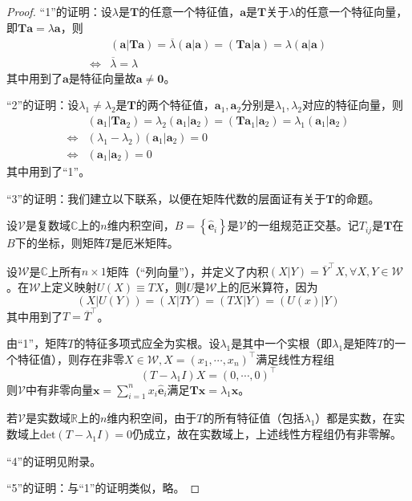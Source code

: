 \documentclass[main.tex]{subfiles}
\begin{document}
\begin{proof}
    “1”的证明：设$\lambda$是$\mathbf{T}$的任意一个特征值，$\mathbf{a}$是$\mathbf{T}$关于$\lambda$的任意一个特征向量，即$\mathbf{Ta}=\lambda\mathbf{a}$，则
    \begin{align*}
                        & \left(\mathbf{a}|\mathbf{Ta}\right)=\overline{\lambda}\left(\mathbf{a}|\mathbf{a}\right)=\left(\mathbf{Ta}|\mathbf{a}\right)=\lambda\left(\mathbf{a}|\mathbf{a}\right) \\
        \Leftrightarrow & \overline{\lambda}=\lambda
    \end{align*}
    其中用到了$\mathbf{a}$是特征向量故$\mathbf{a}\neq\mathbf{0}$。

    “2”的证明：设$\lambda_1\neq\lambda_2$是$\mathbf{T}$的两个特征值，$\mathbf{a}_1,\mathbf{a}_2$分别是$\lambda_1,\lambda_2$对应的特征向量，则
    \begin{align*}
                        & \left(\mathbf{a}_1|\mathbf{Ta}_2\right)=\lambda_2\left(\mathbf{a}_1|\mathbf{a}_2\right)=\left(\mathbf{Ta}_1|\mathbf{a}_2\right)=\lambda_1\left(\mathbf{a}_1|\mathbf{a}_2\right) \\
        \Leftrightarrow & \left(\lambda_1-\lambda_2\right)\left(\mathbf{a}_1|\mathbf{a}_2\right)=0                                                                                                        \\
        \Leftrightarrow & \left(\mathbf{a}_1|\mathbf{a}_2\right)=0
    \end{align*}
    其中用到了“1”。

    “3”的证明：我们建立以下联系，以便在矩阵代数的层面证有关于$\mathbf{T}$的命题。

    设$\mathcal{V}$是复数域$\mathbb{C}$上的$n$维内积空间，$B=\left\{\mathbf{\hat{e}}_i\right\}$是$\mathcal{V}$的一组规范正交基。记$T_{ij}$是$\mathbf{T}$在$B$下的坐标，则矩阵$T$是厄米矩阵。

    设$\mathcal{W}$是$\mathbb{C}$上所有$n\times 1$矩阵（“列向量”），并定义了内积$\left(X|Y\right)=\overline{Y}^\intercal X,\forall X,Y\in\mathcal{W}$。在$\mathcal{W}$上定义映射$U\left(X\right)\equiv TX$，则$U$是$\mathcal{W}$上的厄米算符，因为
    \[\left(X|U\left(Y\right)\right)=\left(X|TY\right)=\left(TX|Y\right)=\left(U\left(x\right)|Y\right)\]
    其中用到了$T=\overline{T}^\intercal$。

    由“1”，矩阵$T$的特征多项式应全为实根。设$\lambda_1$是其中一个实根（即$\lambda_1$是矩阵$T$的一个特征值），则存在非零$X\in\mathcal{W},X=\left(x_1,\cdots,x_n\right)^\intercal$满足线性方程组
    \[\left(T-\lambda_1I\right)X=\left(0,\cdots,0\right)^\intercal\]
    则$\mathcal{V}$中有非零向量$\mathbf{x}=\sum_{i=1}^nx_i\mathbf{\hat{e}}_i$满足$\mathbf{Tx}=\lambda_1\mathbf{x}$。

    若$\mathcal{V}$是实数域$\mathbb{R}$上的$n$维内积空间，由于$T$的所有特征值（包括$\lambda_1$）都是实数，在实数域上$\mathrm{det}\left(T-\lambda_1 I\right)=0$仍成立，故在实数域上，上述线性方程组仍有非零解。

    “4”的证明见附录。

    “5”的证明：与“1”的证明类似，略。
\end{proof}
\end{document}

